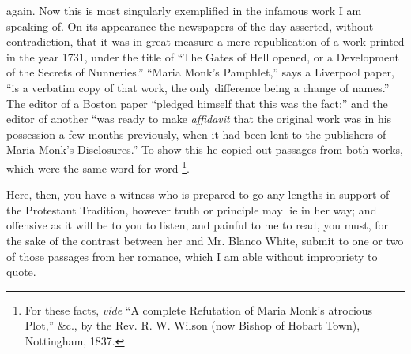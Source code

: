 again. Now this is most singularly exemplified in the
infamous work I am speaking of. On its appearance the
newspapers of the day asserted, without contradiction,
that it was in great measure a mere republication of a
work printed in the year 1731, under the title of
``The Gates of Hell opened, or a Development of the
Secrets of Nunneries.'' ``Maria Monk's
Pamphlet,'' says a Liverpool paper, ``is a
verbatim copy of that work, the only difference being a
change of names.'' The editor of a Boston paper
``pledged himself that this was the fact;'' and
the editor of another ``was ready to make \emph{affidavit}
that the original work was in his possession a few months
previously, when it had been lent to the publishers of
Maria Monk's Disclosures.'' To show this he copied
out passages from both works, which were the same word
for word \footnote{For these facts, \emph{vide}
``A complete Refutation of Maria Monk's atrocious
Plot,'' \&c., by the Rev. R. W. Wilson (now Bishop
of Hobart Town), Nottingham, 1837.}.

Here, then, you have a witness who is prepared to go
any lengths in support of the Protestant Tradition,
however truth or principle may lie in her way; and
offensive as it will be to you to listen, and painful to
me to read, you must, for the sake of the contrast
between her and Mr. Blanco White, submit to one or two of
those passages from her romance, which I am able without
impropriety to quote.

